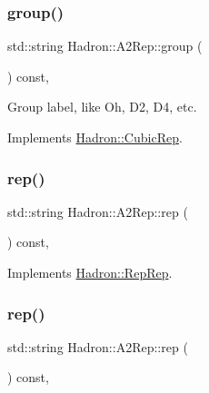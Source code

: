 \subsubsection{\texorpdfstring{group()}{group()}\hspace{0.1cm}{\footnotesize\ttfamily [2/2]}}
{\footnotesize\ttfamily std\+::string Hadron\+::\+A2\+Rep\+::group (\begin{DoxyParamCaption}{ }\end{DoxyParamCaption}) const\hspace{0.3cm}{\ttfamily [inline]}, {\ttfamily [virtual]}}

Group label, like Oh, D2, D4, etc. 

Implements \mbox{\hyperlink{structHadron_1_1CubicRep_a0748f11ec87f387062c8e8981339a29c}{Hadron\+::\+Cubic\+Rep}}.

\mbox{\label{structHadron_1_1A2Rep_a31e1135ddb204394f1c6153797a7dffa}} 
\subsubsection{\texorpdfstring{rep()}{rep()}\hspace{0.1cm}{\footnotesize\ttfamily [1/3]}}
{\footnotesize\ttfamily std\+::string Hadron\+::\+A2\+Rep\+::rep (\begin{DoxyParamCaption}{ }\end{DoxyParamCaption}) const\hspace{0.3cm}{\ttfamily [inline]}, {\ttfamily [virtual]}}



Implements \mbox{\hyperlink{structHadron_1_1RepRep_ab3213025f6de249f7095892109575fde}{Hadron\+::\+Rep\+Rep}}.

\mbox{\label{structHadron_1_1A2Rep_a31e1135ddb204394f1c6153797a7dffa}} 
\subsubsection{\texorpdfstring{rep()}{rep()}\hspace{0.1cm}{\footnotesize\ttfamily [2/3]}}
{\footnotesize\ttfamily std\+::string Hadron\+::\+A2\+Rep\+::rep (\begin{DoxyParamCaption}{ }\end{DoxyParamCaption}) const\hspace{0.3cm}{\ttfamily [inline]}, {\ttfamily [virtual]}}



